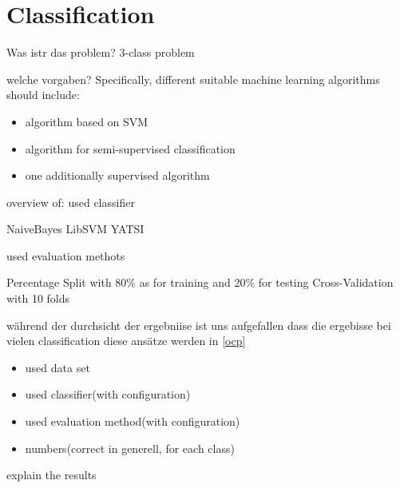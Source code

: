 \section{Classification}
\label{classification}

Was istr das problem?
3-class problem


welche vorgaben?
Specifically, different suitable machine learning algorithms should include:
\begin{itemize}
	\item[\textbullet] algorithm based on SVM
	\item[\textbullet] algorithm for semi-supervised classification
	\item[\textbullet] one additionally supervised algorithm
\end{itemize}


overview of:
used classifier

NaiveBayes
LibSVM
YATSI



used evaluation methots

Percentage Split with 80\% as for training and 20\% for testing
Cross-Validation with 10 folds



während der durchsicht der ergebniise ist uns aufgefallen dass die ergebisse bei vielen classification
diese ansätze werden in \ref{ocp}



\begin{itemize}
	\item[\textbullet] used data set
	\item[\textbullet] used classifier(with configuration)
	\item[\textbullet] used evaluation method(with configuration)
	\item[\textbullet] numbers(correct in generell, for each class)
\end{itemize}



\begin{table}[h]
\label{table:resultsClassifiers}
\end{table}


explain the results
